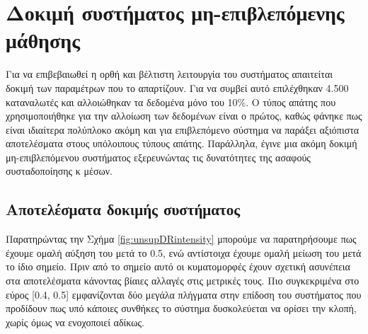 \section{Δοκιμή συστήματος μη-επιβλεπόμενης μάθησης}
Για να επιβεβαιωθεί η ορθή και βέλτιστη λειτουργία του συστήματος απαιτείται δοκιμή των παραμέτρων που το απαρτίζουν. Για να συμβεί αυτό επιλέχθηκαν 4.500 καταναλωτές και αλλοιώθηκαν τα δεδομένα μόνο του 10\%. Ο τύπος απάτης που χρησιμοποιήθηκε για την αλλοίωση των δεδομένων είναι ο πρώτος, καθώς φάνηκε πως είναι ιδιαίτερα πολύπλοκο ακόμη και για επιβλεπόμενο σύστημα να παράξει αξιόπιστα αποτελέσματα στους υπόλοιπους τύπους απάτης. Παράλληλα, έγινε μια ακόμη δοκιμή μη-επιβλεπόμενου συστήματος εξερευνώντας τις δυνατότητες της ασαφούς συσταδοποίησης κ μέσων.\par

\subsection{Αποτελέσματα δοκιμής συστήματος}
Παρατηρώντας την Σχήμα \ref{fig:unsupDRintensity} μπορούμε να παρατηρήσουμε πως έχουμε ομαλή αύξηση του  μετά το 0.5, ενώ αντίστοιχα έχουμε ομαλή μείωση του  μετά το ίδιο σημείο. Πριν από το σημείο αυτό οι κυματομορφές έχουν σχετική ασυνέπεια στα αποτελέσματα κάνοντας βίαιες αλλαγές στις μετρικές τους. Πιο συγκεκριμένα στο εύρος [0.4, 0.5] εμφανίζονται δύο μεγάλα πλήγματα στην επίδοση του συστήματος που προδίδουν πως υπό κάποιες συνθήκες το σύστημα δυσκολεύεται να ορίσει την κλοπή, χωρίς όμως να ενοχοποιεί αδίκως.\par

